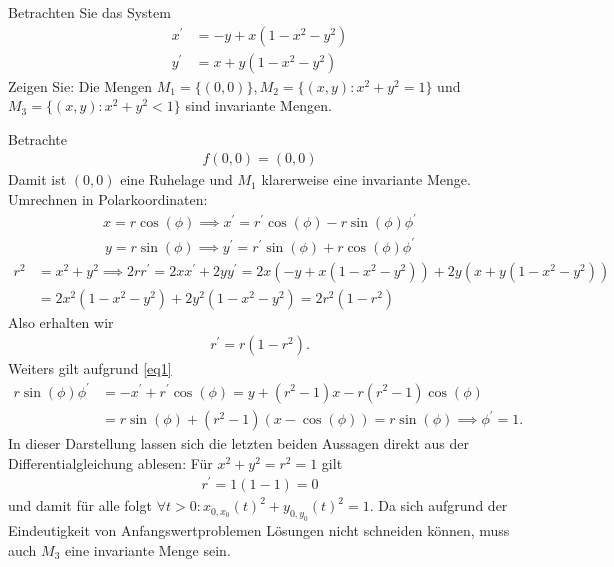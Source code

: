 \begin{exercise}
Betrachten Sie das System
\begin{align*}
  x^{\prime} &= -y + x(1 - x^2 - y^2) \\
  y^{\prime} &= x + y(1 - x^2 - y^2)
\end{align*}
Zeigen Sie: Die Mengen $M_1 = \{(0,0)\}, M_2 = \{(x,y): x^2 + y^2 = 1\}$
und $M_3 = \{(x,y): x^2 + y^2 < 1\}$ sind invariante Mengen.
\end{exercise}
\begin{solution}
Betrachte
\begin{align*}
  f(0,0) = (0,0)
\end{align*}
Damit ist $(0,0)$ eine Ruhelage und $M_1$ klarerweise eine invariante Menge. \\
Umrechnen in Polarkoordinaten:
\begin{align}\label{eq1}
  x = r\cos(\phi) \implies x^{\prime} = r^\prime\cos(\phi)  - r\sin(\phi)\phi^{\prime}
\end{align}
\begin{align*}
  y = r\sin(\phi) \implies y^{\prime} = r^{\prime}\sin(\phi) + r\cos(\phi)\phi^{\prime}
\end{align*}
\begin{align*}
  r^2 &= x^2 + y^2 \implies
  2rr^{\prime} = 2xx^{\prime} + 2yy^{\prime} = 2x(-y + x(1 - x^2 - y^2)) + 2y(x + y(1 - x^2 - y^2)) \\
  &= 2x^2(1 - x^2 - y^2) + 2y^2(1 - x^2 - y^2)
  = 2r^2(1 - r^2)
\end{align*}
Also erhalten wir
\begin{align*}
  r^{\prime} = r(1 - r^2).
\end{align*}
Weiters gilt aufgrund \eqref{eq1}
\begin{align*}
  r \sin(\phi)\phi^{\prime} &= -x^{\prime} + r^{\prime}\cos(\phi) = y + (r^2 - 1)x - r(r^2 - 1)\cos(\phi) \\
  &= r\sin(\phi) + (r^2 - 1)(x-\cos(\phi)) =
  r\sin(\phi) \implies \phi^{\prime} = 1.
\end{align*}
In dieser Darstellung lassen sich die letzten beiden Aussagen direkt aus der Differentialgleichung ablesen:
Für $x^2 + y^2 = r^2 = 1$ gilt
\begin{align*}
  r^{\prime} = 1(1-1)= 0
\end{align*}
und damit für alle folgt $\forall t > 0: x_{0,x_0}(t)^2 + y_{0,y_0}(t)^2 = 1$.
Da sich aufgrund der Eindeutigkeit von Anfangswertproblemen Lösungen nicht schneiden
können, muss auch $M_3$ eine invariante Menge sein.
\end{solution}
